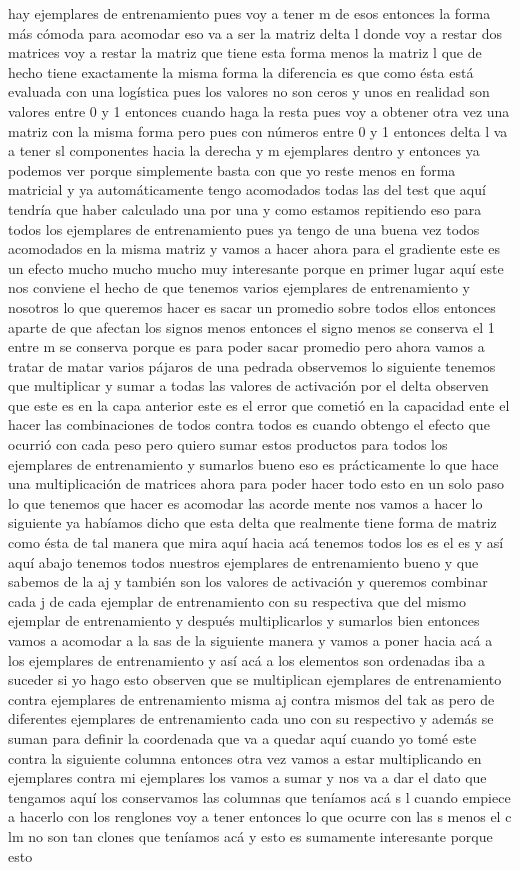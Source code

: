 hay ejemplares de entrenamiento pues voy a tener m de esos entonces la forma más cómoda para acomodar eso va a ser la matriz delta l donde voy a restar dos matrices voy a restar la matriz que tiene esta forma menos la matriz l que de hecho tiene exactamente la misma forma la diferencia es que como ésta está evaluada con una logística pues los valores no son ceros y unos en realidad son valores entre 0 y 1 entonces cuando haga la resta pues voy a obtener otra vez una matriz con la misma forma pero pues con números entre 0 y 1 entonces delta l va a tener sl componentes hacia la derecha y m ejemplares dentro y entonces ya podemos ver porque simplemente basta con que yo reste menos en forma matricial y ya automáticamente tengo acomodados todas las del test que aquí tendría que haber calculado una por una y como estamos repitiendo eso para todos los ejemplares de entrenamiento pues ya tengo de una buena vez todos acomodados en la misma matriz y vamos a hacer ahora para el gradiente este es un efecto mucho mucho mucho muy interesante porque en primer lugar aquí este nos conviene el hecho de que tenemos varios ejemplares de entrenamiento y nosotros lo que queremos hacer es sacar un promedio sobre todos ellos entonces aparte de que afectan los signos menos entonces el signo menos se conserva el 1 entre m se conserva porque es para poder sacar promedio pero ahora vamos a tratar de matar varios pájaros de una pedrada observemos lo siguiente tenemos que multiplicar y sumar a todas las valores de activación por el delta observen que este es en la capa anterior este es el error que cometió en la capacidad ente el hacer las combinaciones de todos contra todos es cuando obtengo el efecto que ocurrió con cada peso pero quiero sumar estos productos para todos los ejemplares de entrenamiento y sumarlos bueno eso es prácticamente lo que hace una multiplicación de matrices ahora para poder hacer todo esto en un solo paso lo que tenemos que hacer es acomodar las acorde mente nos vamos a hacer lo siguiente ya habíamos dicho que esta delta que realmente tiene forma de matriz como ésta de tal manera que mira aquí hacia acá tenemos todos los es el es y así aquí abajo tenemos todos nuestros ejemplares de entrenamiento bueno y que sabemos de la aj y también son los valores de activación y queremos combinar cada j de cada ejemplar de entrenamiento con su respectiva que del mismo ejemplar de entrenamiento y después multiplicarlos y sumarlos bien entonces vamos a acomodar a la sas de la siguiente manera y vamos a poner hacia acá a los ejemplares de entrenamiento y así acá a los elementos son ordenadas iba a suceder si yo hago esto observen que se multiplican ejemplares de entrenamiento contra ejemplares de entrenamiento misma aj contra mismos del tak as pero de diferentes ejemplares de entrenamiento cada uno con su respectivo y además se suman para definir la coordenada que va a quedar aquí cuando yo tomé este contra la siguiente columna entonces otra vez vamos a estar multiplicando en ejemplares contra mi ejemplares los vamos a sumar y nos va a dar el dato que tengamos aquí los conservamos las columnas que teníamos acá s l cuando empiece a hacerlo con los renglones voy a tener entonces lo que ocurre con las s menos el c lm no son tan clones que teníamos acá y esto es sumamente interesante porque esto 